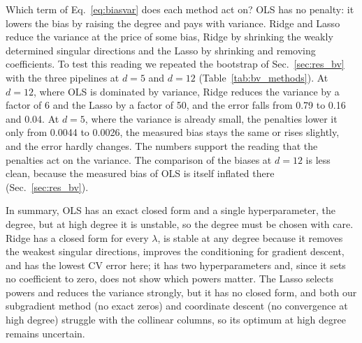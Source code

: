 \documentclass[aps,reprint,amsmath,amssymb,nofootinbib,floatfix]{revtex4-2}
\begin{document}
Which term of Eq.~\eqref{eq:biasvar} does each method act on? OLS has no penalty: it lowers the
bias by raising the degree and pays with variance. Ridge and Lasso reduce the variance at the
price of some bias, Ridge by shrinking the weakly determined singular directions and the Lasso by
shrinking and removing coefficients. To test this reading we repeated the bootstrap of
Sec.~\ref{sec:res_bv} with the three pipelines at $d=5$ and $d=12$
(Table~\ref{tab:bv_methods}). At $d=12$, where OLS is dominated by variance, Ridge reduces the
variance by a factor of 6 and the Lasso by a factor of 50, and the error falls from 0.79 to 0.16
and 0.04. At $d=5$, where the variance is already small, the penalties lower it only from 0.0044
to 0.0026, the measured bias stays the same or rises slightly, and the error hardly changes. The
numbers support the reading that the penalties act on the variance. The comparison of the biases
at $d=12$ is less clean, because the measured bias of OLS is itself inflated there
(Sec.~\ref{sec:res_bv}).

In summary, OLS has an exact closed form and a single hyperparameter, the degree, but at high
degree it is unstable, so the degree must be chosen with care. Ridge has a closed form for every
$\lambda$, is stable at any degree because it removes the weakest singular directions, improves
the conditioning for gradient descent, and has the lowest CV error here; it has two
hyperparameters and, since it sets no coefficient to zero, does not show which powers matter. The
Lasso selects powers and reduces the variance strongly, but it has no closed form, and both our
subgradient method (no exact zeros) and coordinate descent (no convergence at high degree)
struggle with the collinear columns, so its optimum at high degree remains uncertain.
\end{document}
